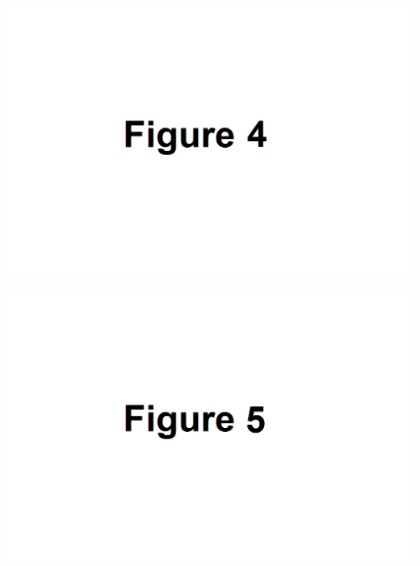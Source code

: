 \documentclass{article}
\begin{document}
\includegraphics[width=1.0\textwidth]{test_figs/test-fig4.png}
 \newpage

\includegraphics[width=1.0\textwidth]{test_figs/test-fig5.png}
 \newpage
\end{document}
